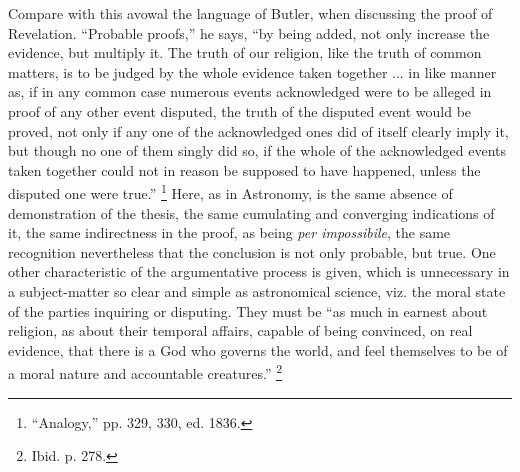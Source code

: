 Compare with this avowal the language of Butler, when discussing
the proof of Revelation. ``Probable proofs,'' he says,
``by being added, not only increase the evidence, but multiply it.
The truth of our religion, like the truth of common matters, is to be
judged by the whole evidence taken together ... in like manner as, if
in any common case numerous events acknowledged were to be alleged in
proof of any other event disputed, the truth of the disputed event
would be proved, not only if any one of the acknowledged ones did of
itself clearly imply it, but though no one of them singly did so, if
the whole of the acknowledged events taken together could not in
reason be supposed to have happened, unless the disputed one were
true.'' \footnote{``Analogy,'' pp. 329, 330, ed. 1836.} Here, as
in Astronomy, is the same absence of demonstration of the thesis, the
same cumulating and converging indications of it, the same
indirectness in the proof, as being \emph{per impossibile}, the
same recognition nevertheless that the conclusion is not only
probable, but true. One other characteristic of the argumentative
process is given, which is unnecessary in a subject-matter so clear
and simple as astronomical science, viz. the moral state of the
parties inquiring or disputing. They must be ``as much in earnest
about religion, as about their temporal affairs, capable of being
convinced, on real evidence, that there is a God who governs the
world, and feel themselves to be of a moral nature and accountable
creatures.'' \footnote{Ibid. p. 278.}

